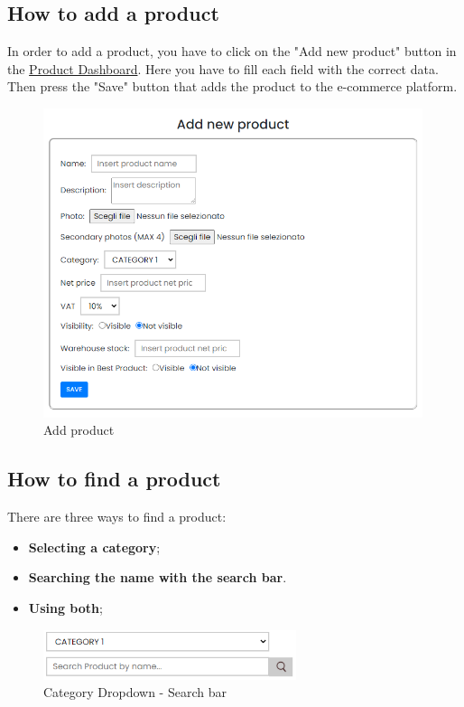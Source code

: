 \subsection{How to add a product}\label{_addProduct}
In order to add a product, you have to click on the "Add new product" button in the \hyperref[_productmanagement]{Product Dashboard}.
Here you have to fill each field with the correct data. Then press the "Save" button that adds the product to the e-commerce platform.
\begin{figure}[H]
    \centering
    \includegraphics[width=30em]{res/images/venditore/addproduct.png}
    \caption{Add product}
\end{figure}

\subsection{How to find a product}\label{_findProduct}
There are three ways to find a product:
\begin{itemize} 
    \item \textbf{Selecting a category};
    \item \textbf{Searching the name with the search bar}. 
    \item \textbf{Using both};
\end{itemize}

\begin{figure}[H]
    \centering
    \includegraphics[width=20em]{res/images/venditore/categoryandsearchbar.png}
    \caption{Category Dropdown - Search bar}
\end{figure}

